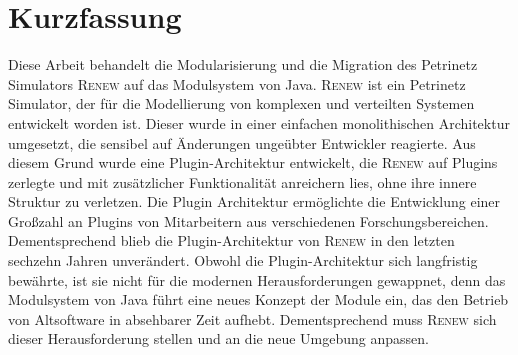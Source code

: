 



\newpage

\chapter*{Kurzfassung}
Diese Arbeit behandelt die Modularisierung und die Migration des Petrinetz Simulators \textsc{Renew} auf das Modulsystem von Java. \bigbreak
\textsc{Renew} ist ein Petrinetz Simulator, der für die Modellierung von komplexen und verteilten Systemen entwickelt worden ist. Dieser wurde in einer einfachen monolithischen Architektur umgesetzt, die sensibel auf Änderungen ungeübter Entwickler reagierte. Aus diesem Grund wurde eine Plugin-Architektur entwickelt, die \textsc{Renew} auf Plugins zerlegte und mit zusätzlicher Funktionalität anreichern lies, ohne ihre innere Struktur zu verletzen. \bigbreak
Die Plugin Architektur ermöglichte die Entwicklung einer Großzahl an Plugins von Mitarbeitern aus verschiedenen Forschungsbereichen. Dementsprechend blieb die Plugin-Architektur von \textsc{Renew} in den letzten sechzehn Jahren unverändert. \bigbreak
Obwohl die Plugin-Architektur sich langfristig bewährte, ist sie nicht für die modernen Herausforderungen gewappnet, denn das Modulsystem von Java führt eine neues Konzept der Module ein, das den Betrieb von Altsoftware 
in absehbarer Zeit aufhebt. Dementsprechend muss \textsc{Renew} sich dieser Herausforderung stellen und an die neue Umgebung anpassen. \newline


